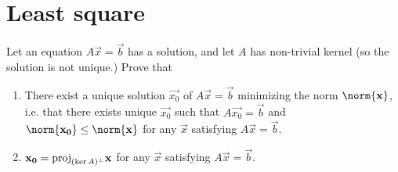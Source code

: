 \section{Least square}
\setcounter{exercise}{4}
\begin{exercise}
  Let an equation $A\vec{x}=\vec{b}$ has a solution, 
  and let $A$ has non-trivial kernel (so the solution is
  not unique.) Prove that
  \begin{enumerate}[label={(\alph*)}]
    \item There exist a unique solution $\vec{x_0}$ of $A\vec{x}=\vec{b}$
      minimizing the norm $\norm{\vec{x}}$, i.e. that there exists 
      unique $\vec{x_0}$ such that $A\vec{x_0}=\vec{b}$ and 
      $\norm{\vec{x_0}}\leq\norm{\vec{x}}$ for any $\vec{x}$
      satisfying $A\vec{x}=\vec{b}$.
    \item $\vec{x_0}=\proj{\vec{x}}{(\ker A)\perc}$ for any $\vec{x}$
      satisfying $A\vec{x}=\vec{b}$.
  \end{enumerate}
\end{exercise}
